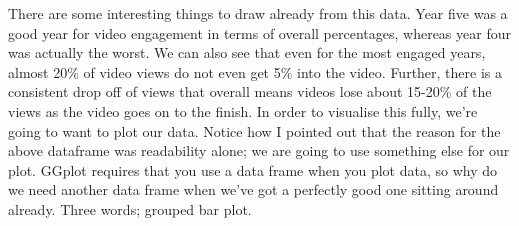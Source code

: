 \documentclass[
]{article}
\newenvironment{Shaded}{\begin{snugshade}}{\end{snugshade}}
\newcommand{\DataTypeTok}[1]{\textcolor[rgb]{0.13,0.29,0.53}{#1}}
\newcommand{\DecValTok}[1]{\textcolor[rgb]{0.00,0.00,0.81}{#1}}
\newcommand{\KeywordTok}[1]{\textcolor[rgb]{0.13,0.29,0.53}{\textbf{#1}}}
\newcommand{\NormalTok}[1]{#1}
\newcommand{\StringTok}[1]{\textcolor[rgb]{0.31,0.60,0.02}{#1}}
\begin{document}
There are some interesting things to draw already from this data. Year
five was a good year for video engagement in terms of overall
percentages, whereas year four was actually the worst. We can also see
that even for the most engaged years, almost 20\% of video views do not
even get 5\% into the video. Further, there is a consistent drop off of
views that overall means videos lose about 15-20\% of the views as the
video goes on to the finish. In order to visualise this fully, we're
going to want to plot our data. Notice how I pointed out that the reason
for the above dataframe was readability alone; we are going to use
something else for our plot. GGplot requires that you use a data frame
when you plot data, so why do we need another data frame when we've got
a perfectly good one sitting around already. Three words; grouped bar
plot.

\begin{Shaded}
\end{Shaded}
\end{document}
